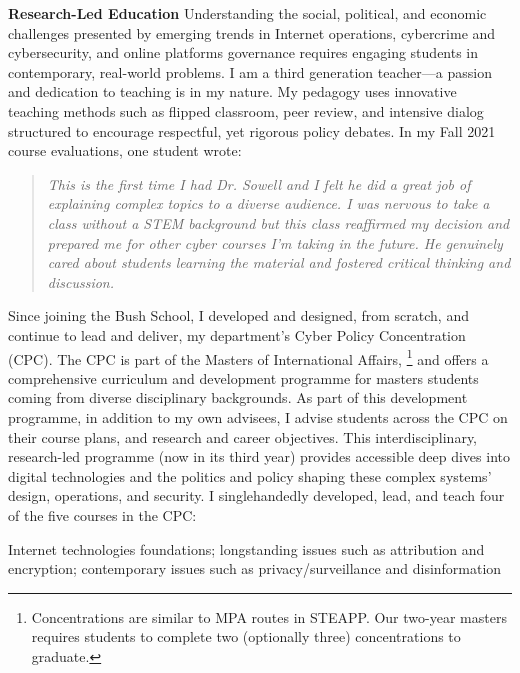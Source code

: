 \documentclass[11pt]{letter}
\begin{document}
\begin{letter}
\textbf{Research-Led Education} \vspace{0.2 \baselineskip} \newline %
%
Understanding the social, political, and economic challenges presented by emerging trends in Internet operations, cybercrime and cybersecurity, and online platforms governance requires engaging students in contemporary, real-world problems.
%
I am a third generation teacher---a passion and dedication to teaching is in my nature.
%
My pedagogy uses innovative teaching methods such as flipped classroom, peer review, and intensive dialog structured to encourage respectful, yet rigorous policy debates.
%
In my Fall 2021 course evaluations, one student wrote:
%
\begin{quote}
  \emph{This is the first time I had Dr. Sowell and I felt he did a great job of explaining complex topics to a diverse audience. I was nervous to take a class without a STEM background but this class reaffirmed my decision and prepared me for other cyber courses I'm taking in the future. He genuinely cared about students learning the material and fostered critical thinking and discussion.}
\end{quote}

Since joining the Bush School, I developed and designed, from scratch, and continue to lead and deliver, my department’s Cyber Policy Concentration (CPC).
%
The CPC is part of the Masters of International Affairs,%
  \footnote{Concentrations are similar to MPA routes in STEAPP.  Our two-year masters requires students to complete two (optionally three) concentrations to graduate.} %
and offers a comprehensive curriculum and development programme for masters students coming from diverse disciplinary backgrounds.
%
As part of this development programme, in addition to my own advisees, I advise students across the CPC on their course plans, and research and career objectives.
%
This interdisciplinary, research-led programme (now in its third year) provides accessible deep dives into digital technologies and the politics and policy shaping these complex systems' design, operations, and security.
%
I singlehandedly developed, lead, and teach four of the five courses in the CPC:
%
\begin{description}[leftmargin=0.5cm]
  \item[Introduction to Cyber Policy:] Internet technologies foundations; longstanding issues such as attribution and encryption; contemporary issues such as privacy/surveillance and disinformation


\end{description}
\end{letter}
\end{document}
